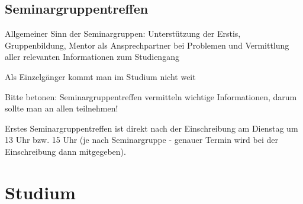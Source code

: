 \documentclass[a4paper,12pt]{report}
\begin{document}
\subsection{Seminargruppentreffen}
\begin{itemize*}
\item Allgemeiner Sinn der Seminargruppen: Unterstützung der Erstis, Gruppenbildung, Mentor als Ansprechpartner bei Problemen und Vermittlung aller relevanten Informationen zum Studiengang 
\item \glqq Als Einzelgänger kommt man im Studium nicht weit\grqq
\item Bitte betonen: Seminargruppentreffen vermitteln wichtige Informationen, darum sollte man an allen teilnehmen!
\item Erstes Seminargruppentreffen ist direkt nach der Einschreibung am Dienstag um 13 Uhr bzw. 15 Uhr (je nach Seminargruppe - genauer Termin wird bei der Einschreibung dann mitgegeben).

\end{itemize*}

\section{Studium}
\end{document}
